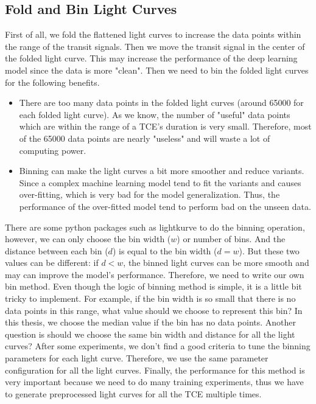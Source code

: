     \subsection{Fold and Bin Light Curves}
      First of all, we fold the flattened light curves to increase the data points within 
      the range of the transit signals. Then we move the transit signal in the center 
      of the folded light curve. This may increase the performance of the deep learning model 
      since the data is more "clean". Then we need to bin the folded light curves for the 
      following benefits. 
      \begin{itemize}
        \item There are too many data points in the folded light curves 
          (around 65000 for each folded light curve). 
          As we know, the number of "useful" data points which are within the range of a 
          TCE's duration is very small. Therefore, most of the 65000 data points are 
          nearly "useless" and will waste a lot of computing power. 
        \item Binning can make the light curves a bit more smoother and reduce variants.
          Since a complex machine learning model tend to fit the variants and causes
          over-fitting, which is very bad for the model generalization. Thus, the performance
          of the over-fitted model tend to perform bad on the unseen data.
      \end{itemize}

      There are some python packages such as lightkurve to do the binning operation, however, 
      we can only choose the bin width ($w$) or number of bins. And the distance between 
      each bin ($d$) is equal to the bin width ($d=w$). But these two values can be different:
      if $d<w$, the binned light curves can be more smooth and may can improve the model's 
      performance. Therefore, we need to write our own bin method. Even though the logic 
      of binning method is simple, it is a little bit tricky to implement. For example, if the bin width is so small that there is no data points in this range, what value 
      should we choose to 
      represent this bin? In this thesis, we choose the median value if the bin has no 
      data points. Another question is should we choose the same 
      bin width and distance for all the light curves? After some experiments, 
      we don't find a 
      good criteria to tune the binning parameters for each light curve. Therefore, we use 
      the same parameter configuration for all the light curves. Finally, the performance for 
      this method is very important because we need to do 
      many training experiments, thus we have to generate preprocessed light curves for all 
      the TCE multiple times. 

